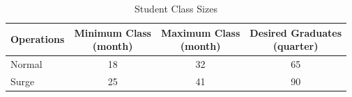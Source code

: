 \documentclass[preprint,12pt]{elsarticle}
\begin{document}
\begin{table}[h]
    \caption{SLEP Courses of Action}
    \label{t:SimScen}
  \begin{center}
    \end{center}
\end{table}

\begin{table}[h]
    \caption{Student Class Sizes}
  \label{t:StudScen}
    \begin{center}
    \begin{tabular}{l c c c}
      \hline
      \hline
      \textbf{Operations} & \makecell{\textbf{Minimum Class} \\ (month)} &
      \makecell{\textbf{Maximum Class} \\ (month)} & \makecell{\textbf{Desired Graduates} \\ (quarter)}\\
      \hline
      Normal  & 18 & 32 & 65\\
      Surge  & 25 & 41 & 90\\
      \hline
    \end{tabular}
    \end{center}
\end{table}
\end{document}
